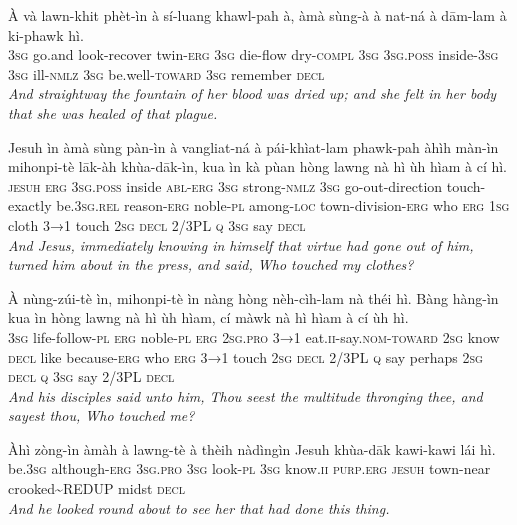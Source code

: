 \documentclass[11pt,a4paper]{article}
\begin{document}
\begin{exe}
\gll À và lawn-khit phèt-ìn à sí-luang khawl-pah à, àmà sùng-à à nat-ná à dām-lam à ki-phawk hì. \\
     \textsc{3sg} go.and look-recover twin-\textsc{erg} \textsc{3sg} die-flow dry-\textsc{compl} \textsc{3sg} \textsc{3sg}.\textsc{poss} inside-\textsc{3sg} \textsc{3sg} ill-\textsc{nmlz} \textsc{3sg} be.well-\textsc{toward} \textsc{3sg} remember \textsc{decl} \\
\glt \textcolor{kjvcolor}{\textit{And straightway the fountain of her blood was dried up; and she felt in her body that she was healed of that plague.}}

\gll Jesuh ìn àmà sùng pàn-ìn à vangliat-ná à pái-khìat-lam phawk-pah àhìh màn-ìn mihonpi-tè lāk-àh khùa-dāk-ìn, kua ìn kà pùan hòng lawng nà hì ùh hìam à cí hì. \\
     \textsc{jesuh} \textsc{erg} \textsc{3sg}.\textsc{poss} inside \textsc{abl}-\textsc{erg} \textsc{3sg} strong-\textsc{nmlz} \textsc{3sg} go-out-direction touch-exactly be.\textsc{3sg}.\textsc{rel} reason-\textsc{erg} noble-\textsc{pl} among-\textsc{loc} town-division-\textsc{erg} who \textsc{erg} \textsc{1sg} cloth \textsc{3→1} touch \textsc{2sg} \textsc{decl} 2/3PL \textsc{q} \textsc{3sg} say \textsc{decl} \\
\glt \textcolor{kjvcolor}{\textit{And Jesus, immediately knowing in himself that virtue had gone out of him, turned him about in the press, and said, Who touched my clothes?}}

\gll À nùng-zúi-tè ìn, mihonpi-tè ìn nàng hòng nèh-cìh-lam nà théi hì. Bàng hàng-ìn kua ìn hòng lawng nà hì ùh hìam, cí màwk nà hì hìam à cí ùh hì. \\
     \textsc{3sg} life-follow-\textsc{pl} \textsc{erg} noble-\textsc{pl} \textsc{erg} \textsc{2sg}.\textsc{pro} \textsc{3→1} eat.\textsc{ii}-say.\textsc{nom}-\textsc{toward} \textsc{2sg} know \textsc{decl} like because-\textsc{erg} who \textsc{erg} \textsc{3→1} touch \textsc{2sg} \textsc{decl} 2/3PL \textsc{q} say perhaps \textsc{2sg} \textsc{decl} \textsc{q} \textsc{3sg} say 2/3PL \textsc{decl} \\
\glt \textcolor{kjvcolor}{\textit{And his disciples said unto him, Thou seest the multitude thronging thee, and sayest thou, Who touched me?}}

\gll Àhì zòng-ìn àmàh à lawng-tè à thèih nàdìngìn Jesuh khùa-dāk kawi-kawi lái hì. \\
     be.\textsc{3sg} although-\textsc{erg} \textsc{3sg}.\textsc{pro} \textsc{3sg} look-\textsc{pl} \textsc{3sg} know.\textsc{ii} \textsc{purp}.\textsc{erg} \textsc{jesuh} town-near crooked\textasciitilde{}REDUP midst \textsc{decl} \\
\glt \textcolor{kjvcolor}{\textit{And he looked round about to see her that had done this thing.}}


\end{exe}
\end{document}
